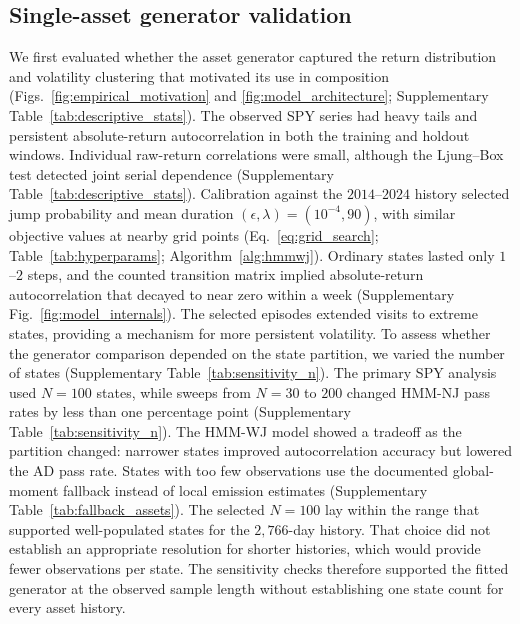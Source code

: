 \subsection{Single-asset generator validation}

We first evaluated whether the asset generator captured the return
distribution and volatility clustering that motivated its use in
composition (Figs.~\ref{fig:empirical_motivation} and
\ref{fig:model_architecture}; Supplementary Table~\ref{tab:descriptive_stats}). The observed SPY series had heavy tails
and persistent absolute-return autocorrelation in both the training
and holdout windows. Individual raw-return correlations were small,
although the Ljung--Box test detected joint serial dependence
(Supplementary Table~\ref{tab:descriptive_stats}). Calibration against the
$2014$--$2024$ history selected jump probability and mean duration
$(\epsilon,\lambda)=(10^{-4},90)$, with similar objective values at
nearby grid points (Eq.~\eqref{eq:grid_search};
Table~\ref{tab:hyperparams}; Algorithm~\ref{alg:hmmwj}). Ordinary
states lasted only $1$--$2$ steps, and the counted transition matrix
implied absolute-return autocorrelation that decayed to near zero
within a week (Supplementary Fig.~\ref{fig:model_internals}). The selected episodes
extended visits to extreme states, providing a mechanism for more
persistent volatility.
To assess whether the generator comparison depended on the state
partition, we varied the number of states
(Supplementary Table~\ref{tab:sensitivity_n}). The primary SPY analysis used $N=100$ states, while
sweeps from $N=30$ to $200$ changed HMM-NJ pass rates by less than
one percentage point (Supplementary Table~\ref{tab:sensitivity_n}). The HMM-WJ
model showed a tradeoff as the partition changed: narrower states
improved autocorrelation accuracy but lowered the AD pass rate.
States with too few observations use the documented global-moment
fallback instead of local emission estimates
(Supplementary Table~\ref{tab:fallback_assets}). The selected
$N=100$ lay within the range that supported well-populated states
for the $2{,}766$-day history. That choice did not establish an
appropriate resolution for shorter histories, which would provide
fewer observations per state. The sensitivity checks therefore
supported the fitted generator at the observed sample length without
establishing one state count for every asset history.



